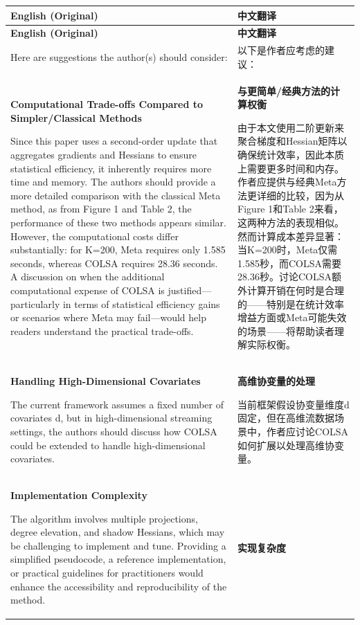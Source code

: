 \documentclass[10pt,a4paper]{article}
\begin{document}
\begin{longtable}{L{0.48\textwidth}|L{0.48\textwidth}}
\hline
\textbf{English (Original)} & \textbf{中文翻译} \\
\hline
\endfirsthead
\hline
\textbf{English (Original)} & \textbf{中文翻译} \\
\hline
\endhead
Here are suggestions the author(s) should consider:
&
以下是作者应考虑的建议： \\
\hline
\textbf{Computational Trade-offs Compared to Simpler/Classical Methods}

Since this paper uses a second-order update that aggregates gradients and Hessians to ensure statistical efficiency, it inherently requires more time and memory. The authors should provide a more detailed comparison with the classical Meta method, as from Figure 1 and Table 2, the performance of these two methods appears similar. However, the computational costs differ substantially: for K=200, Meta requires only 1.585 seconds, whereas COLSA requires 28.36 seconds. A discussion on when the additional computational expense of COLSA is justified---particularly in terms of statistical efficiency gains or scenarios where Meta may fail---would help readers understand the practical trade-offs.
&
\textbf{与更简单/经典方法的计算权衡}

由于本文使用二阶更新来聚合梯度和Hessian矩阵以确保统计效率，因此本质上需要更多时间和内存。作者应提供与经典Meta方法更详细的比较，因为从Figure 1和Table 2来看，这两种方法的表现相似。然而计算成本差异显著：当K=200时，Meta仅需1.585秒，而COLSA需要28.36秒。讨论COLSA额外计算开销在何时是合理的——特别是在统计效率增益方面或Meta可能失效的场景——将帮助读者理解实际权衡。 \\
\hline
\textbf{Handling High-Dimensional Covariates}

The current framework assumes a fixed number of covariates d, but in high-dimensional streaming settings, the authors should discuss how COLSA could be extended to handle high-dimensional covariates.
&
\textbf{高维协变量的处理}

当前框架假设协变量维度d固定，但在高维流数据场景中，作者应讨论COLSA如何扩展以处理高维协变量。 \\
\hline
\textbf{Implementation Complexity}

The algorithm involves multiple projections, degree elevation, and shadow Hessians, which may be challenging to implement and tune. Providing a simplified pseudocode, a reference implementation, or practical guidelines for practitioners would enhance the accessibility and reproducibility of the method.
&
\textbf{实现复杂度}


\end{longtable}
\end{document}
